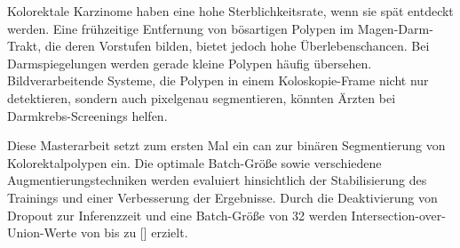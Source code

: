 Kolorektale Karzinome haben eine hohe Sterblichkeitsrate, wenn sie spät entdeckt werden.
Eine frühzeitige Entfernung von bösartigen Polypen im Magen-Darm-Trakt, die deren Vorstufen bilden, bietet jedoch hohe Überlebenschancen.
Bei Darmspiegelungen werden gerade kleine Polypen häufig übersehen.
Bildverarbeitende Systeme, die Polypen in einem Koloskopie-Frame nicht nur detektieren, sondern auch pixelgenau segmentieren, könnten Ärzten bei Darmkrebs-Screenings helfen.

Diese Masterarbeit setzt zum ersten Mal ein \acrlong{can} zur binären Segmentierung von Kolorektalpolypen ein.
Die optimale Batch-Größe sowie verschiedene Augmentierungstechniken werden evaluiert hinsichtlich der Stabilisierung des Trainings und einer Verbesserung der Ergebnisse.
Durch die Deaktivierung von Dropout zur Inferenzzeit und eine Batch-Größe von 32 werden Intersection-over-Union-Werte von bis zu [] erzielt.
